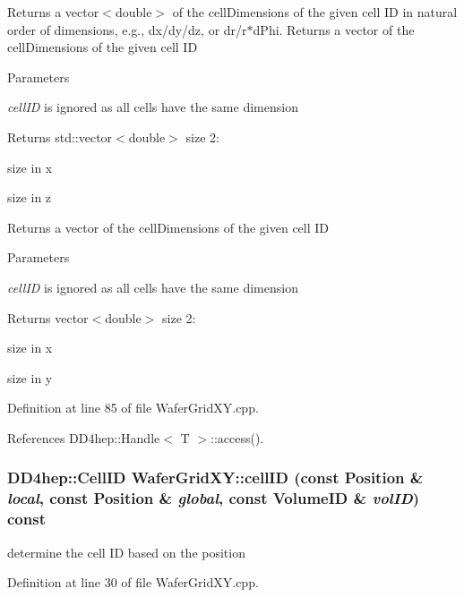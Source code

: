 Returns a vector$<$double$>$ of the cellDimensions of the given cell ID in natural order of dimensions, e.g., dx/dy/dz, or dr/r$\ast$dPhi. Returns a vector of the cellDimensions of the given cell ID 
\begin{DoxyParams}{Parameters}
\item[{\em cellID}]is ignored as all cells have the same dimension \end{DoxyParams}
\begin{DoxyReturn}{Returns}
std::vector$<$double$>$ size 2:
\begin{DoxyEnumerate}
\item size in x
\item size in z
\end{DoxyEnumerate}
\end{DoxyReturn}
Returns a vector of the cellDimensions of the given cell ID 
\begin{DoxyParams}{Parameters}
\item[{\em cellID}]is ignored as all cells have the same dimension \end{DoxyParams}
\begin{DoxyReturn}{Returns}
vector$<$double$>$ size 2:
\begin{DoxyEnumerate}
\item size in x
\item size in y 
\end{DoxyEnumerate}
\end{DoxyReturn}


Definition at line 85 of file WaferGridXY.cpp.

References DD4hep::Handle$<$ T $>$::access().\hypertarget{class_d_d4hep_1_1_geometry_1_1_wafer_grid_x_y_a77568e8d248dc62dfbe87ca150dcd692}{
\subsubsection[{cellID}]{\setlength{\rightskip}{0pt plus 5cm}DD4hep::CellID WaferGridXY::cellID (const {\bf Position} \& {\em local}, \/  const {\bf Position} \& {\em global}, \/  const VolumeID \& {\em volID}) const}}
\label{class_d_d4hep_1_1_geometry_1_1_wafer_grid_x_y_a77568e8d248dc62dfbe87ca150dcd692}


determine the cell ID based on the position 

Definition at line 30 of file WaferGridXY.cpp.

